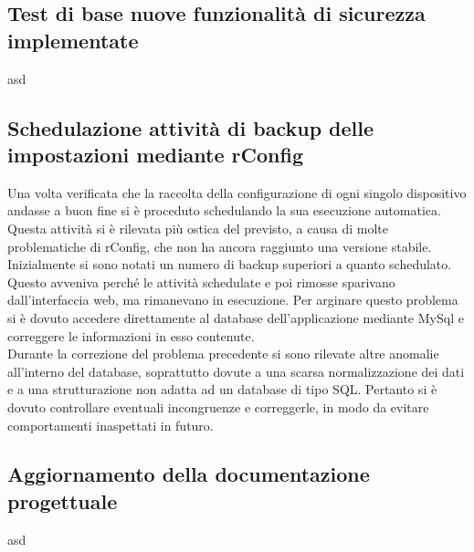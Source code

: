 \documentclass[Realizzazione.tex]{subfiles}
\begin{document}
\subsection{Test di base nuove funzionalità di sicurezza implementate} 
asd

\subsection{Schedulazione attività di backup delle impostazioni mediante rConfig}
Una volta verificata che la raccolta della configurazione di ogni singolo dispositivo andasse a buon fine si è proceduto schedulando la sua esecuzione automatica. \\
Questa attività si è rilevata più ostica del previsto, a causa di molte problematiche di rConfig, che non ha ancora raggiunto una versione stabile. \\
Inizialmente si sono notati un numero di backup superiori a quanto schedulato. Questo avveniva perché le attività schedulate e poi rimosse sparivano dall'interfaccia web, ma rimanevano in esecuzione. Per arginare questo problema si è dovuto accedere direttamente al database dell'applicazione mediante MySql e correggere le informazioni in esso contenute. \\
Durante la correzione del problema precedente si sono rilevate altre anomalie all'interno del database, soprattutto dovute a una scarsa normalizzazione dei dati e a una strutturazione non adatta ad un database di tipo SQL. Pertanto si è dovuto controllare eventuali incongruenze e correggerle, in modo da evitare comportamenti inaspettati in futuro.

\subsection{Aggiornamento della documentazione progettuale}
asd

	
\end{document}
